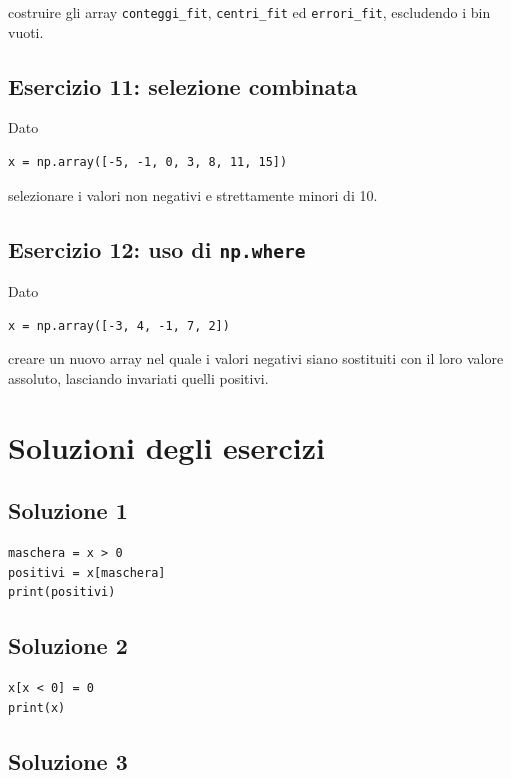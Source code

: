\documentclass[11pt,a4paper]{book}
\begin{document}
costruire gli array \texttt{conteggi\_fit}, \texttt{centri\_fit} ed \texttt{errori\_fit}, escludendo i bin vuoti.

\subsection*{Esercizio 11: selezione combinata}

Dato

\begin{lstlisting}
x = np.array([-5, -1, 0, 3, 8, 11, 15])
\end{lstlisting}

selezionare i valori non negativi e strettamente minori di 10.

\subsection*{Esercizio 12: uso di \texttt{np.where}}

Dato

\begin{lstlisting}
x = np.array([-3, 4, -1, 7, 2])
\end{lstlisting}

creare un nuovo array nel quale i valori negativi siano sostituiti con il loro valore assoluto, lasciando invariati quelli positivi.

\section{Soluzioni degli esercizi}

\subsection*{Soluzione 1}

\begin{lstlisting}
maschera = x > 0
positivi = x[maschera]
print(positivi)
\end{lstlisting}

\subsection*{Soluzione 2}

\begin{lstlisting}
x[x < 0] = 0
print(x)
\end{lstlisting}

\subsection*{Soluzione 3}
\end{document}
